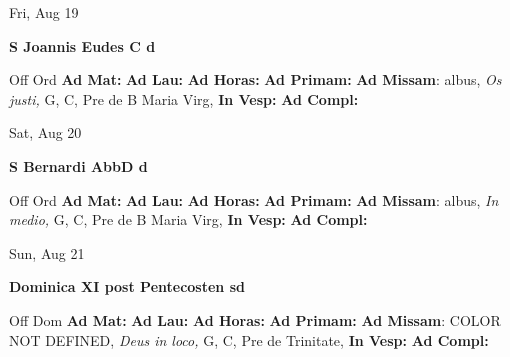 \documentclass[10pt]{memoir}
\begin{document}
\begin{center}
\begin{minipage}{3.5in}
\vspace{2em}
\begin{center}Fri, Aug 19
\end{center}
\textbf{ \large S Joannis Eudes C
\textnormal{\normalsize d}}

\begin{justify}Off Ord
\textbf{Ad Mat: }
\textbf{Ad Lau: }
\textbf{Ad Horas: }
\textbf{Ad Primam: }\textbf{Ad Missam}: albus, \textit{Os justi,} G, C, Pre de B Maria Virg, 
\textbf{In Vesp: }
\textbf{Ad Compl: }
\end{justify}
\end{minipage}
\end{center}

\begin{center}
\begin{minipage}{3.5in}
\vspace{2em}
\begin{center}Sat, Aug 20
\end{center}
\textbf{ \large S Bernardi AbbD
\textnormal{\normalsize d}}

\begin{justify}Off Ord
\textbf{Ad Mat: }
\textbf{Ad Lau: }
\textbf{Ad Horas: }
\textbf{Ad Primam: }\textbf{Ad Missam}: albus, \textit{In medio,} G, C, Pre de B Maria Virg, 
\textbf{In Vesp: }
\textbf{Ad Compl: }
\end{justify}
\end{minipage}
\end{center}

\begin{center}
\begin{minipage}{3.5in}
\vspace{2em}
\begin{center}Sun, Aug 21
\end{center}
\textbf{ \large Dominica XI post Pentecosten
\textnormal{\normalsize sd}}

\begin{justify}Off Dom
\textbf{Ad Mat: }
\textbf{Ad Lau: }
\textbf{Ad Horas: }
\textbf{Ad Primam: }\textbf{Ad Missam}: COLOR NOT DEFINED, \textit{Deus in loco,} G, C, Pre de Trinitate, 
\textbf{In Vesp: }
\textbf{Ad Compl: }
\end{justify}
\end{minipage}
\end{center}
\end{document}
